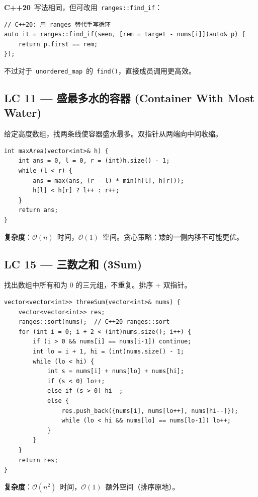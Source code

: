 \documentclass[12pt,a4paper,fontset=fandol]{ctexbook}
\newcommand{\bigO}[1]{\mathcal{O}(#1)}
\newcommand{\Fn}[1]{\texttt{#1()}}
\newcommand{\Tp}[1]{\texttt{#1}}
\begin{document}
\begin{compare}
\textbf{C++20}~写法相同，但可改用~\texttt{ranges::find\_if}：
\begin{lstlisting}[style=cppstyle,numbers=none]
// C++20: 用 ranges 替代手写循环
auto it = ranges::find_if(seen, [rem = target - nums[i]](auto& p) {
    return p.first == rem;
});
\end{lstlisting}
不过对于~\Tp{unordered\_map}~的~\Fn{find}，直接成员调用更高效。
\end{compare}

\subsection*{LC 11 — 盛最多水的容器 (Container With Most Water)}

给定高度数组，找两条线使容器盛水最多。双指针从两端向中间收缩。

\begin{lstlisting}[style=cppstyle]
int maxArea(vector<int>& h) {
    int ans = 0, l = 0, r = (int)h.size() - 1;
    while (l < r) {
        ans = max(ans, (r - l) * min(h[l], h[r]));
        h[l] < h[r] ? l++ : r++;
    }
    return ans;
}
\end{lstlisting}
\textbf{复杂度}：$\bigO{n}$~时间，$\bigO{1}$~空间。贪心策略：矮的一侧内移不可能更优。

\subsection*{LC 15 — 三数之和 (3Sum)}

找出数组中所有和为 0 的三元组，不重复。排序 + 双指针。

\begin{lstlisting}[style=cppstyle]
vector<vector<int>> threeSum(vector<int>& nums) {
    vector<vector<int>> res;
    ranges::sort(nums);  // C++20 ranges::sort
    for (int i = 0; i + 2 < (int)nums.size(); i++) {
        if (i > 0 && nums[i] == nums[i-1]) continue;
        int lo = i + 1, hi = (int)nums.size() - 1;
        while (lo < hi) {
            int s = nums[i] + nums[lo] + nums[hi];
            if (s < 0) lo++;
            else if (s > 0) hi--;
            else {
                res.push_back({nums[i], nums[lo++], nums[hi--]});
                while (lo < hi && nums[lo] == nums[lo-1]) lo++;
            }
        }
    }
    return res;
}
\end{lstlisting}
\textbf{复杂度}：$\bigO{n^2}$~时间，$\bigO{1}$~额外空间（排序原地）。

\end{document}

